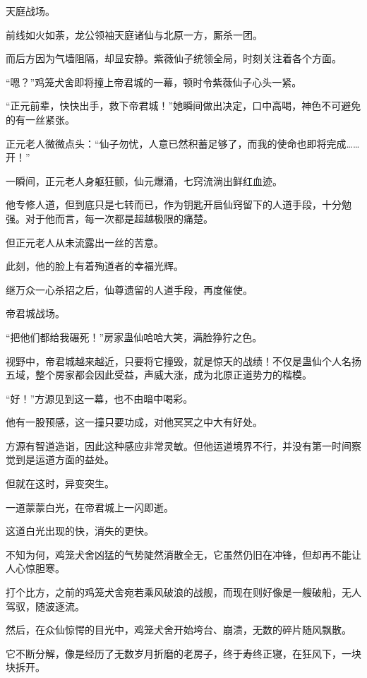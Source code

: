 
\begin{this_body}

天庭战场。

前线如火如荼，龙公领袖天庭诸仙与北原一方，厮杀一团。

而后方因为气墙阻隔，却显安静。紫薇仙子统领全局，时刻关注着各个方面。

“嗯？”鸡笼犬舍即将撞上帝君城的一幕，顿时令紫薇仙子心头一紧。

“正元前辈，快快出手，救下帝君城！”她瞬间做出决定，口中高喝，神色不可避免的有一丝紧张。

正元老人微微点头：“仙子勿忧，人意已然积蓄足够了，而我的使命也即将完成……开！”

一瞬间，正元老人身躯狂颤，仙元爆涌，七窍流淌出鲜红血迹。

他专修人道，但到底只是七转而已，作为钥匙开启仙窍留下的人道手段，十分勉强。对于他而言，每一次都是超越极限的痛楚。

但正元老人从未流露出一丝的苦意。

此刻，他的脸上有着殉道者的幸福光辉。

继万众一心杀招之后，仙尊遗留的人道手段，再度催使。

帝君城战场。

“把他们都给我碾死！”房家蛊仙哈哈大笑，满脸狰狞之色。

视野中，帝君城越来越近，只要将它撞毁，就是惊天的战绩！不仅是蛊仙个人名扬五域，整个房家都会因此受益，声威大涨，成为北原正道势力的楷模。

“好！”方源见到这一幕，也不由暗中喝彩。

他有一股预感，这一撞只要功成，对他冥冥之中大有好处。

方源有智道造诣，因此这种感应非常灵敏。但他运道境界不行，并没有第一时间察觉到是运道方面的益处。

但就在这时，异变突生。

一道蒙蒙白光，在帝君城上一闪即逝。

这道白光出现的快，消失的更快。

不知为何，鸡笼犬舍凶猛的气势陡然消散全无，它虽然仍旧在冲锋，但却再不能让人心惊胆寒。

打个比方，之前的鸡笼犬舍宛若乘风破浪的战舰，而现在则好像是一艘破船，无人驾驭，随波逐流。

然后，在众仙惊愕的目光中，鸡笼犬舍开始垮台、崩溃，无数的碎片随风飘散。

它不断分解，像是经历了无数岁月折磨的老房子，终于寿终正寝，在狂风下，一块块拆开。


\end{this_body}
